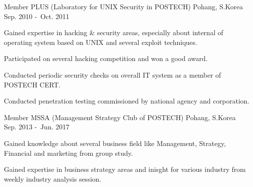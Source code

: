 \begin{cventries}
  \cventry
    {Member} %
    {PLUS (Laboratory for UNIX Security in POSTECH)} %
    {Pohang, S.Korea} %
    {Sep. 2010 -\ Oct. 2011} %
    {
      \begin{cvitems} %
        \item {Gained expertise in hacking \& security areas, especially about internal of operating system based on UNIX and several exploit techniques.}
        \item {Participated on several hacking competition and won a good award.}
        \item {Conducted periodic security checks on overall IT system as a member of POSTECH CERT.}
        \item {Conducted penetration testing commissioned by national agency and corporation.}
      \end{cvitems}
    }

  \cventry
    {Member} %
    {MSSA (Management Strategy Club of POSTECH)} %
    {Pohang, S.Korea} %
    {Sep. 2013 -\ Jun. 2017} %
    {
      \begin{cvitems} %
        \item {Gained knowledge about several business field like Management, Strategy, Financial and marketing from group study.}
        \item {Gained expertise in business strategy areas and inisght for various industry from weekly industry analysis session.}
      \end{cvitems}
    }

\end{cventries}
